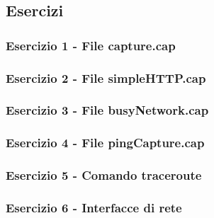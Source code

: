 \documentclass[a4paper]{article}
\begin{document}
	\subsection[\textcolor{Red3}{\textbf{Esercizi}}]{Esercizi}
	
	\subsubsection{Esercizio 1 - File \textsf{capture.cap}}
	
	\subsubsection{Esercizio 2 - File \textsf{simpleHTTP.cap}}
	
	\subsubsection{Esercizio 3 - File \textsf{busyNetwork.cap}}
	
	\subsubsection{Esercizio 4 - File \textsf{pingCapture.cap}}
	
	\subsubsection{Esercizio 5 - Comando \textsf{traceroute}}
	
	\subsubsection{Esercizio 6 - Interfacce di rete}
\end{document}
